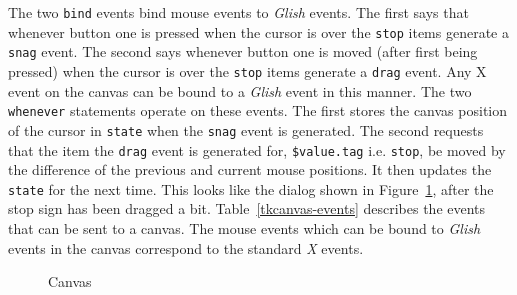 The two {\tt bind} events bind mouse events to {\em Glish} events. 
The first says that
whenever button one is pressed when the cursor is over the {\tt stop} items generate
a {\tt snag} event. The second says whenever button one is moved (after first being
pressed) when the cursor is over the {\tt stop} items generate a {\tt drag} event.
Any X event on the canvas can be bound to a {\em Glish} event in this
manner. The two
{\tt whenever} statements operate on these events. The first stores the canvas
position of the cursor in {\tt state} when the {\tt snag} event is generated. The
second requests that the item the {\tt drag} event is generated for,
\verb+$value.tag+ i.e. {\tt stop}, be moved by the difference of the previous and
current mouse positions. It then updates the {\tt state} for the next time. This
 looks like the dialog shown in Figure~\ref{tkcanvas}, after the stop sign has
been dragged a bit. Table~\ref{tkcanvas-events} describes the events that can be
sent to a canvas. The mouse events which can be bound to {\em Glish} 
events in the canvas correspond to the standard {\em X} events. 

\begin{figure}[thb]
\centerline{}
\caption{ Canvas }
\label{tkcanvas}
\end{figure}

